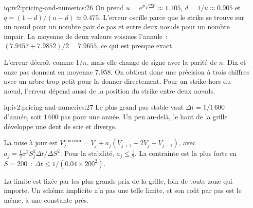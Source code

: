 \begin{solution}{iq:iv2:pricing-and-numerics:26}
On prend $u = e^{\sigma\sqrt{\Delta t}} \approx 1.105$, $d = 1/u \approx 0.905$ et $q = (1 - d)/(u - d) \approx 0.475$. L'erreur oscille parce que le strike se trouve sur un nœud pour un nombre pair de pas et entre deux nœuds pour un nombre impair. La moyenne de deux valeurs voisines l'annule~: $(7.9457 + 7.9852)/2 = 7.9655$, ce qui est presque exact.

L'erreur décroît comme $1/n$, mais elle change de signe avec la parité de $n$. Dix et onze pas donnent en moyenne 7.958. On obtient donc une précision à trois chiffres avec un arbre trop petit pour la donner directement. Pour un strike hors du nœud, l'erreur dépend aussi de la position du strike entre deux nœuds.

\end{solution}

\begin{solution}{iq:iv2:pricing-and-numerics:27}
Le plus grand pas stable vaut $\Delta t = 1/1\,600$ d'année, soit 1\,600 pas pour une année. Un peu au-delà, le haut de la grille développe une dent de scie et diverge.

La mise à jour est $V_j^{\text{nouveau}} = V_j + a_j(V_{j+1} - 2V_j + V_{j-1})$, avec $a_j = \tfrac12\sigma^2S_j^2\Delta t/\Delta S^2$. Pour la stabilité, $a_j \leq \tfrac12$. La contrainte est la plus forte en $S = 200$~: $\Delta t \leq 1/(0.04 \times 200^2)$.

La limite est fixée par les plus grands prix de la grille, loin de toute zone qui importe. Un schéma implicite n'a pas une telle limite, et son coût par pas est le même, à une constante près.

\end{solution}

